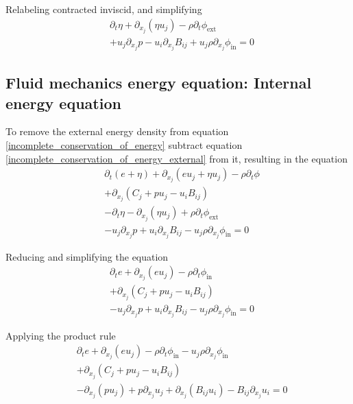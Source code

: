 \documentclass[%
 reprint,
 amsmath,amssymb,
 aps,
]{revtex4-1}
\begin{document}
Relabeling contracted inviscid, and simplifying
\begin{equation}
\begin{split}
& \partial_t\eta + \partial_{x_j}\left(\eta u_j\right) - \rho\partial_t\phi_{\text{ext}} \\ & + u_j\partial_{x_j}p - u_i\partial_{x_j}B_{ij} + u_j\rho\partial_{x_j}\phi_{\text{in}}=0
\end{split}
\label{incomplete_conservation_of_energy_external}
\end{equation}

\subsection{Fluid mechanics energy equation: Internal energy equation}
To remove the external energy density from equation \eqref{incomplete_conservation_of_energy} subtract equation \eqref{incomplete_conservation_of_energy_external} from it, resulting in the equation
\[
\begin{split}
& \partial_t\left(e + \eta\right) + \partial_{x_j}\left(e u_j + \eta u_j\right) - \rho\partial_t\phi \\ & + \partial_{x_j}\left(C_j + p u_j - u_i B_{ij}\right) \\ & - \partial_t\eta - \partial_{x_j}\left(\eta u_j\right) + \rho\partial_t\phi_{\text{ext}} \\ & - u_j\partial_{x_j}p + u_i\partial_{x_j}B_{ij} - u_j\rho\partial_{x_j}\phi_{\text{in}}=0
\end{split}
\]

Reducing and simplifying the equation
\[
\begin{split}
& \partial_te + \partial_{x_j}\left(e u_j\right) - \rho\partial_t\phi_{\text{in}} \\ & + \partial_{x_j}\left(C_j + p u_j - u_i B_{ij}\right) \\ & - u_j\partial_{x_j}p + u_i\partial_{x_j}B_{ij} - u_j\rho\partial_{x_j}\phi_{\text{in}}=0
\end{split}
\]

Applying the product rule
\[
\begin{split}
& \partial_te + \partial_{x_j}\left(e u_j\right) - \rho\partial_t\phi_{\text{in}} - u_j\rho\partial_{x_j}\phi_{\text{in}} \\ & + \partial_{x_j}\left(C_j + p u_j - u_i B_{ij}\right) \\ & - \partial_{x_j}\left(p u_j\right) + p\partial_{x_j}u_j + \partial_{x_j}\left(B_{ij}u_i\right) - B_{ij}\partial_{x_j}u_i=0
\end{split}
\]
\end{document}
